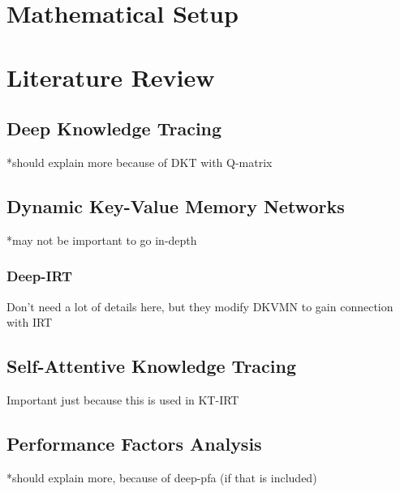 \section{Mathematical Setup}

\section{Literature Review}\label{sec:kt_lit}

\subsection{Deep Knowledge Tracing}
*should explain more because of DKT with Q-matrix

\subsection{Dynamic Key-Value Memory Networks}
*may not be important to go in-depth

\subsubsection{Deep-IRT}
Don't need a lot of details here, but they modify DKVMN to gain connection with IRT

\subsection{Self-Attentive Knowledge Tracing}
Important just because this is used in KT-IRT

\subsection{Performance Factors Analysis}
*should explain more, because of deep-pfa (if that is included)




